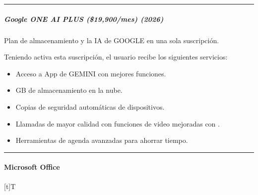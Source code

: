 \documentclass[letterpaper,10pt,spanish]{sphinxmanual}
\let\sphinxpxdimen\pdfpxdimen\else\newdimen\sphinxpxdimen
\begin{document}
\bigskip\hrule\bigskip



\subparagraph{Google ONE \sphinxhyphen{} AI PLUS (\$19,900/mes) (2026)}
\label{\detokenize{cursos/ofimatica10/recursos/T01:google-one-ai-plus-19-900-mes-2026}}
\sphinxAtStartPar
\sphinxfootnotemark[2] Plan de almacenamiento y la IA de GOOGLE en una sola suscripción.

\sphinxAtStartPar
Teniendo activa esta suscripción, el usuario recibe los siguientes servicios:
\begin{itemize}
\item {} 
\sphinxAtStartPar
Acceso a App de GEMINI con mejores funciones.

\item {} 
 GB de almacenamiento en la nube.

\item {} 
\sphinxAtStartPar
Copias de seguridad automáticas de dispositivos.

\item {} 
\sphinxAtStartPar
Llamadas de mayor calidad con funciones de video mejoradas con .

\item {} 
\sphinxAtStartPar
Herramientas de agenda avanzadas para ahorrar tiempo.

\end{itemize}


\bigskip\hrule\bigskip



\paragraph{Microsoft Office}
\label{\detokenize{cursos/ofimatica10/recursos/T01:microsoft-office}}

\begin{savenotes}\sphinxattablestart
\sphinxthistablewithglobalstyle
\centering
\begin{tabulary}{\linewidth}[t]{T}
\sphinxtoprule
\sphinxtableatstartofbodyhook

\begin{sphinxfigure-in-table}
\centering
\capstart
\noindent\sphinxincludegraphics[width=450\sphinxpxdimen]{{image014}.png}
\label{\detokenize{cursos/ofimatica10/recursos/T01:id10}}\end{sphinxfigure-in-table}\relax
\\
\sphinxbottomrule
\end{tabulary}
\sphinxtableafterendhook\par
\sphinxattableend\end{savenotes}
\end{document}
